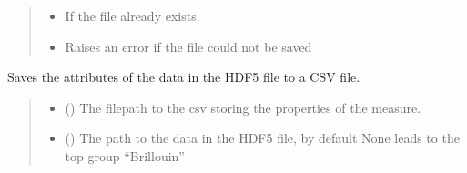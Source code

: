 \documentclass[letterpaper,10pt,english]{sphinxmanual}
\begin{document}
\begin{fulllineitems}
\begin{fulllineitems}
\begin{quote}
\begin{description}
\begin{itemize}
\item {} 
\sphinxAtStartPar
{} \textendash{} If the file already exists.

\item {} 
\sphinxAtStartPar
{} \textendash{} Raises an error if the file could not be saved

\end{itemize}

\end{description}\end{quote}

\end{fulllineitems}


\begin{fulllineitems}
\label{\detokenize{_autosummary/HDF5_BLS.wrapper:HDF5_BLS.wrapper.Wrapper.save_properties_csv}}
\pysigstartsignatures
\pysiglinewithargsret
{}
{\sphinxparamcomma {}}
{}
\pysigstopsignatures
\sphinxAtStartPar
Saves the attributes of the data in the HDF5 file to a CSV file.
\begin{quote}\begin{description}
\begin{itemize}
\item {} 
\sphinxAtStartPar
{} () \textendash{} The filepath to the csv storing the properties of the measure.

\item {} 
\sphinxAtStartPar
{} (\sphinxstyleliteralemphasis{\sphinxupquote{, }}) \textendash{} The path to the data in the HDF5 file, by default None leads to the top group “Brillouin”

\end{itemize}

\end{description}\end{quote}


\end{fulllineitems}
\end{fulllineitems}
\end{document}
